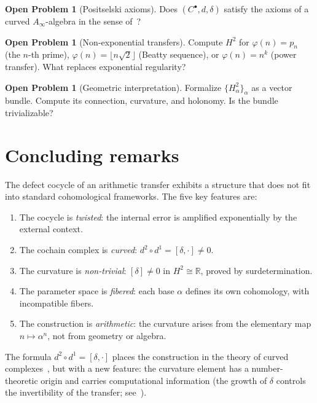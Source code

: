 \documentclass[11pt,a4paper]{article}
\theoremstyle{plain}
\theoremstyle{definition}
\newtheorem{problem}[theorem]{Open Problem}
\theoremstyle{remark}
\newcommand{\RR}{\mathbb{R}}
\begin{document}
\begin{problem}[Positselski axioms]
\label{prob:positselski}
Does $(C^\bullet, d, \delta)$ satisfy the axioms of a curved 
$A_\infty$-algebra in the sense of~\cite{Positselski2011}?
\end{problem}

\begin{problem}[Non-exponential transfers]
\label{prob:non-exp}
Compute $H^2$ for $\varphi(n) = p_n$ (the $n$-th prime), 
$\varphi(n) = \lfloor n\sqrt{2} \rfloor$ (Beatty sequence), or 
$\varphi(n) = n^k$ (power transfer). What replaces exponential 
regularity?
\end{problem}

\begin{problem}[Geometric interpretation]
\label{prob:geometric}
Formalize $\{H^2_\alpha\}_\alpha$ as a vector bundle. Compute its 
connection, curvature, and holonomy. Is the bundle trivializable?
\end{problem}

\section{Concluding remarks}
\label{sec:conclusion}

The defect cocycle of an arithmetic transfer exhibits a structure that 
does not fit into standard cohomological frameworks. The five key 
features are:

\begin{enumerate}
\item The cocycle is \textit{twisted}: the internal error is amplified 
exponentially by the external context.
\item The cochain complex is \textit{curved}: $d^2 \circ d^1 = 
[\delta, \cdot] \neq 0$.
\item The curvature is \textit{non-trivial}: $[\delta] \neq 0$ in 
$H^2 \cong \RR$, proved by surdetermination.
\item The parameter space is \textit{fibered}: each base $\alpha$ 
defines its own cohomology, with incompatible fibers.
\item The construction is \textit{arithmetic}: the curvature arises 
from the elementary map $n \mapsto \alpha^n$, not from geometry or 
algebra.
\end{enumerate}

The formula $d^2 \circ d^1 = [\delta, \cdot]$ places the construction 
in the theory of curved complexes~\cite{Positselski2011}, but with a 
new feature: the curvature element has a number-theoretic origin and 
carries computational information (the growth of $\delta$ controls the 
invertibility of the transfer; see~\cite{Nembe2026AGT4}).
\end{document}
